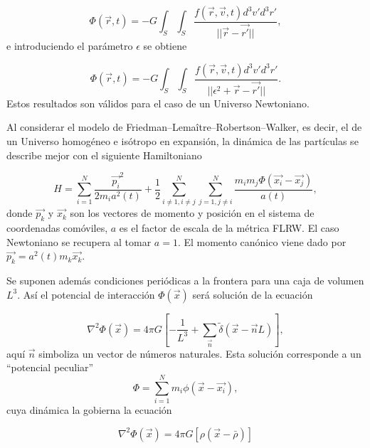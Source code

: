 \documentclass[a4paper,openright,12pt]{book}
\begin{document}
\begin{equation}
  \Phi(\vec{r},t)
  = -G
  \int_{S}\int_{S}
  \frac{f(\vec{r}, \vec{v}, t)d^{3}v'd^{3}r'}{||\vec{r}-\vec{r'}||},\label{eqn2.8}
\end{equation}
e introduciendo el parámetro $\epsilon$ se obtiene

\begin{equation}
 \Phi(\vec{r},t)
  = -G
  \int_{S}\int_{S}
  \frac{f(\vec{r}, \vec{v}, t)d^{3}v'd^{3}r'}{||\epsilon^{2} + \vec{r}-\vec{r'}||}.\label{eqn2.9}
\end{equation}
Estos resultados son válidos para el caso de un Universo Newtoniano.

Al considerar el modelo de Friedman--Lemaître--Robertson--Walker, es decir, el de un Universo homogéneo e isótropo en expansión, la dinámica de las partículas se describe mejor con el siguiente Hamiltoniano

\begin{equation}
  H 
  = \sum_{i=1}^{N} \frac{\vec{p_{i}}^{2}}{2 m_{i} a^{2}(t)} 
  +
  \frac{1}{2} \sum_{i\not=1,i\not=j}^{N}\sum_{j=1,j\not=i}^{N}
  \frac{m_{i}m_{j}\Phi(\vec{x_{i}}-\vec{x_{j}})}{a(t)},\label{eqn2.10}
\end{equation}
donde $\vec{p_{k}}$ y $\vec{x_{k}}$ son los vectores de momento y posición en el sistema de coordenadas comóviles, $a$ es el factor de escala de la métrica FLRW. El caso Newtoniano se recupera al tomar $a = 1$. El momento canónico viene dado por $\vec{p_{k}} = a^{2}(t)m_{k}\vec{x_{k}}$.

Se suponen además condiciones periódicas a la frontera para una caja de volumen $L^{3}$. Así el potencial de interacción $\Phi(\vec{x})$ será solución de la ecuación

\begin{equation}
 \nabla^{2}\Phi(\vec{x})
 =
 4\pi G
 \left[
 -\frac{1}{L^{3}}
 +
 \sum_{\vec{n}} \tilde{\delta}(\vec{x}-\vec{n}L)
 \right],\label{eqn2.11}
\end{equation}
aquí $\vec{n}$ simboliza un vector de números naturales. Esta solución corresponde a un “potencial peculiar”
\begin{equation}
 \Phi
 =
 \sum_{i=1}^{N} m_{i} \phi(\vec{x}-\vec{x_{i}}),\label{eqn2.12}
\end{equation}
cuya dinámica la gobierna la ecuación

\begin{equation}
  \nabla^{2}\Phi(\vec{x})
  =
  4 \pi G
  [\rho(\vec{x}-\bar{\rho})]\label{eqn2.13}
\end{equation}
\end{document}
